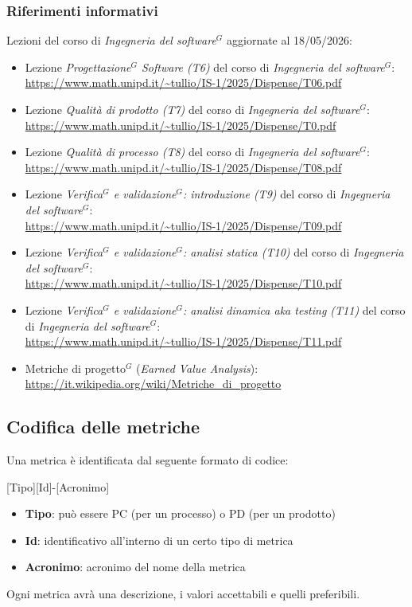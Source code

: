 \documentclass[a4paper,10pt]{article}
\begin{document}
\subsubsection{Riferimenti informativi}
Lezioni del corso di \textit{Ingegneria del software$^G$} aggiornate al 18/05/2026:
\begin{itemize}
    \item Lezione \textit{Progettazione$^G$ Software (T6)} del corso di \textit{Ingegneria del software$^G$}: \\ \url{https://www.math.unipd.it/~tullio/IS-1/2025/Dispense/T06.pdf}
    \item Lezione \textit{Qualità di prodotto (T7)} del corso di \textit{Ingegneria del software$^G$}: \\ \url{https://www.math.unipd.it/~tullio/IS-1/2025/Dispense/T0.pdf}
    \item Lezione \textit{Qualità di processo (T8)} del corso di \textit{Ingegneria del software$^G$}: \\ \url{https://www.math.unipd.it/~tullio/IS-1/2025/Dispense/T08.pdf}
    \item Lezione \textit{Verifica$^G$ e validazione$^G$: introduzione (T9)} del corso di \textit{Ingegneria del software$^G$}: \\ \url{https://www.math.unipd.it/~tullio/IS-1/2025/Dispense/T09.pdf}
    \item Lezione \textit{Verifica$^G$ e validazione$^G$: analisi statica (T10)} del corso di \textit{Ingegneria del software$^G$}: \\ \url{https://www.math.unipd.it/~tullio/IS-1/2025/Dispense/T10.pdf}
    \item Lezione \textit{Verifica$^G$ e validazione$^G$: analisi dinamica aka testing (T11)} del corso di \textit{Ingegneria del software$^G$}: \\ \url{https://www.math.unipd.it/~tullio/IS-1/2025/Dispense/T11.pdf}
    \item Metriche di progetto$^G$ (\textit{Earned Value Analysis}): \\ \url{https://it.wikipedia.org/wiki/Metriche_di_progetto}
\end{itemize}
\subsection{Codifica delle metriche}
Una metrica è identificata dal seguente formato di codice: 
\begin{center}
    [Tipo][Id]-[Acronimo]
\end{center}
\begin{itemize}
    \item \textbf{Tipo}: può essere PC (per un processo) o PD (per un prodotto)
    \item \textbf{Id}: identificativo all'interno di un certo tipo di metrica
    \item \textbf{Acronimo}: acronimo del nome della metrica
\end{itemize}
Ogni metrica avrà una descrizione, i valori accettabili e quelli preferibili.
\end{document}
